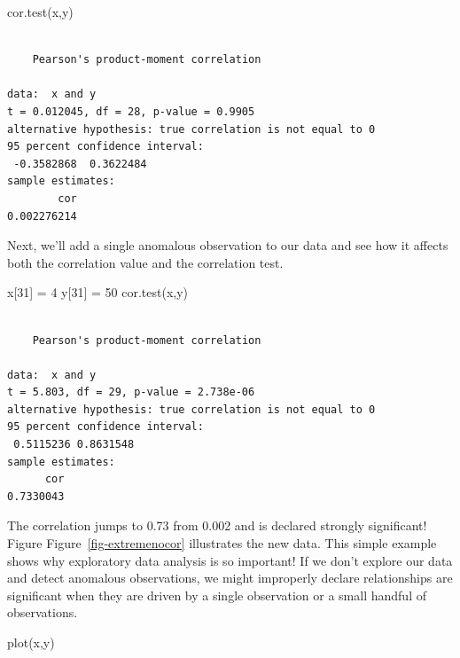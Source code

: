 \documentclass[
  letterpaper,
  DIV=11,
  numbers=noendperiod]{scrreprt}
\newenvironment{Shaded}{\begin{snugshade}}{\end{snugshade}}
\newcommand{\DecValTok}[1]{\textcolor[rgb]{0.68,0.00,0.00}{#1}}
\newcommand{\FunctionTok}[1]{\textcolor[rgb]{0.28,0.35,0.67}{#1}}
\newcommand{\NormalTok}[1]{\textcolor[rgb]{0.00,0.23,0.31}{#1}}
\newcommand{\OtherTok}[1]{\textcolor[rgb]{0.00,0.23,0.31}{#1}}
\begin{document}
\begin{Shaded}
\begin{Highlighting}[]
\FunctionTok{cor.test}\NormalTok{(x,y)}
\end{Highlighting}
\end{Shaded}

\begin{verbatim}

    Pearson's product-moment correlation

data:  x and y
t = 0.012045, df = 28, p-value = 0.9905
alternative hypothesis: true correlation is not equal to 0
95 percent confidence interval:
 -0.3582868  0.3622484
sample estimates:
        cor 
0.002276214 
\end{verbatim}

Next, we'll add a single anomalous observation to our data and see how
it affects both the correlation value and the correlation test.

\begin{Shaded}
\begin{Highlighting}[]
\NormalTok{x[}\DecValTok{31}\NormalTok{] }\OtherTok{=} \DecValTok{4}
\NormalTok{y[}\DecValTok{31}\NormalTok{] }\OtherTok{=} \DecValTok{50}
\FunctionTok{cor.test}\NormalTok{(x,y)}
\end{Highlighting}
\end{Shaded}

\begin{verbatim}

    Pearson's product-moment correlation

data:  x and y
t = 5.803, df = 29, p-value = 2.738e-06
alternative hypothesis: true correlation is not equal to 0
95 percent confidence interval:
 0.5115236 0.8631548
sample estimates:
      cor 
0.7330043 
\end{verbatim}

The correlation jumps to 0.73 from 0.002 and is declared strongly
significant! Figure Figure~\ref{fig-extremenocor} illustrates the new
data. This simple example shows why exploratory data analysis is so
important! If we don't explore our data and detect anomalous
observations, we might improperly declare relationships are significant
when they are driven by a single observation or a small handful of
observations.

\begin{Shaded}
\begin{Highlighting}[]
\FunctionTok{plot}\NormalTok{(x,y)}
\end{Highlighting}
\end{Shaded}
\end{document}
